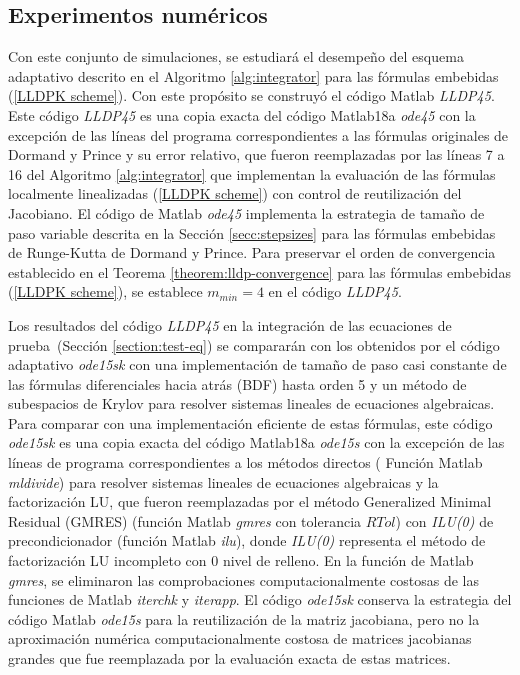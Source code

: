 \subsection{Experimentos numéricos}\label{section:num-exp-lldp-var-step}
Con este conjunto de simulaciones, se estudiará el desempeño del esquema adaptativo descrito en el Algoritmo \ref{alg:integrator} para las fórmulas embebidas (\ref{LLDPK scheme}). Con este propósito se construyó el código Matlab \emph{LLDP45}. Este código \emph{LLDP45} es una copia exacta del código Matlab18a \emph{ode45} \cite{shampine1997matlab} con la excepción de las líneas del programa correspondientes a las fórmulas originales de Dormand y Prince y su error relativo, que fueron reemplazadas por las líneas 7 a 16 del Algoritmo \ref{alg:integrator} que implementan la evaluación de las fórmulas localmente linealizadas (\ref{LLDPK scheme}) con control de reutilización del Jacobiano. El código de Matlab \emph{ode45} implementa la estrategia de tamaño de paso variable descrita en la Sección \ref{secc:stepsizes} para las fórmulas embebidas de Runge-Kutta de Dormand y Prince. Para preservar el orden de convergencia establecido en el Teorema \ref{theorem:lldp-convergence} para las fórmulas embebidas (\ref{LLDPK scheme}), se establece $m_{min}=4$ en el código \emph{LLDP45}.

Los resultados del código \emph{LLDP45} en la integración de las ecuaciones de prueba~(Sección \ref{section:test-eq}) se compararán con los obtenidos por el código adaptativo \emph{ode15sk} con una implementación de tamaño de paso casi constante de las fórmulas diferenciales hacia atrás (BDF) hasta orden 5 y un método de subespacios de Krylov para resolver sistemas lineales de ecuaciones algebraicas. Para comparar con una implementación eficiente de estas fórmulas, este código \emph{ode15sk} es una copia exacta del código Matlab18a \emph{ode15s} \cite{shampine1997matlab} con la excepción de las líneas de programa correspondientes a los métodos directos ( Función Matlab \emph{mldivide}) para resolver sistemas lineales de ecuaciones algebraicas y la factorización LU, que fueron reemplazadas por el método Generalized Minimal Residual (GMRES) (función Matlab \emph{gmres} con tolerancia $RTol$) con \emph{ILU(0)} de precondicionador (función Matlab \emph{ilu}), donde \emph{ILU(0)} representa el método de factorización LU incompleto con 0 nivel de relleno. En la función de Matlab \emph{gmres}, se eliminaron las comprobaciones computacionalmente costosas de las funciones de Matlab \emph{iterchk} y \emph{iterapp}. El código \emph{ode15sk} conserva la estrategia del código Matlab \emph{ode15s} para la reutilización de la matriz jacobiana, pero no la aproximación numérica computacionalmente costosa de matrices jacobianas grandes que fue reemplazada por la evaluación exacta de estas matrices.

